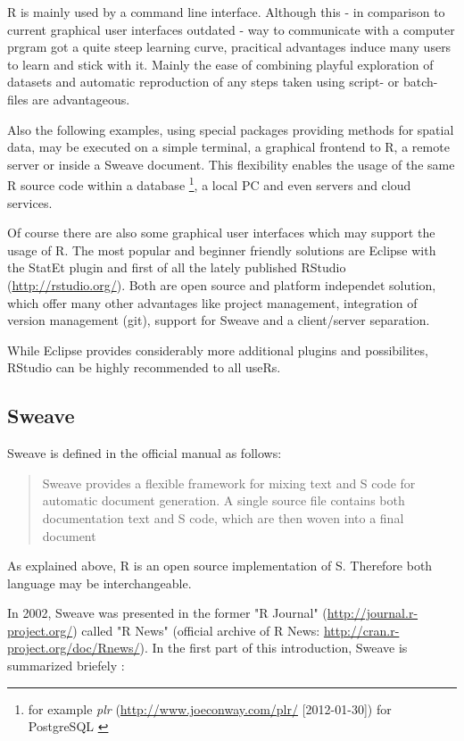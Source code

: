 \documentclass{ifacconf}
\begin{document}
R is mainly used by a command line interface. Although this - in comparison
to current graphical user interfaces outdated - way to communicate 
with a computer prgram got a quite steep learning curve, pracitical 
advantages induce many users to learn and stick with it. Mainly the
ease of combining playful exploration of datasets and automatic
reproduction of any steps taken using script- or batch-files are advantageous.

Also the following examples, using special packages providing methods 
for spatial data, may be executed on a simple terminal, a graphical frontend to R,
a remote server or inside a Sweave document. This flexibility enables 
the usage of the same R source code within a database
\footnote{for example \textit{plr} (\url{http://www.joeconway.com/plr/} [2012-01-30]) for PostgreSQL 
\citep{group2011postgresql}}, a local PC and even servers and cloud services.

Of course there are also some graphical user interfaces which may support
the usage of R. The most popular and beginner friendly solutions are
Eclipse with the StatEt plugin and first of all the lately published RStudio
(\url{http://rstudio.org/}). Both are open source and platform independet solution,
which offer many other advantages like project management, integration of version 
management (git), support for Sweave and a client/server separation.

While Eclipse provides considerably more additional plugins and possibilites,
RStudio can be highly recommended to all useRs.

\subsection{Sweave}
Sweave is defined in the official manual \citep{Sweave:Leisch:2002} as follows:
\begin{quotation}
Sweave provides a flexible 
framework for mixing text 
and S code for automatic document generation. 
A single source file contains both documentation text and S code, which are then woven
into a final document
\end{quotation} 

As explained above, R is an open source implementation of S. Therefore both 
language may be interchangeable.

In 2002, Sweave was presented in the former "R Journal"
(\url{http://journal.r-project.org/}) called "R News" (official archive of R News: \url{http://cran.r-project.org/doc/Rnews/}). In the first part of this 
introduction, Sweave is summarized briefely \citep{Sweave:Leisch:2002}:
\end{document}
